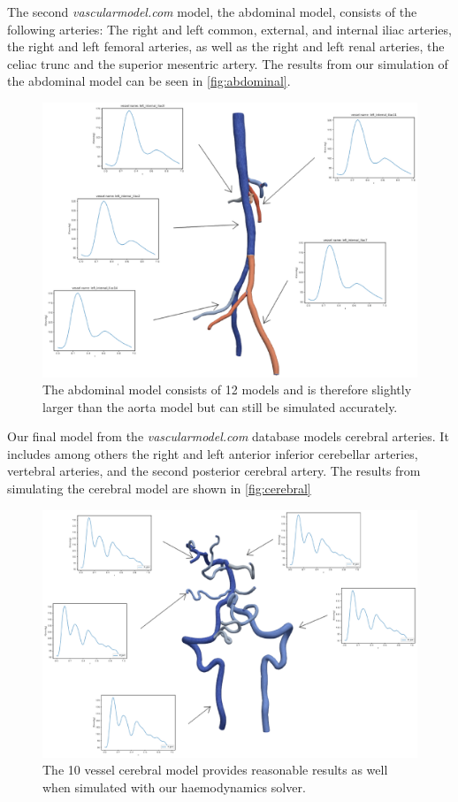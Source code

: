 \documentclass[a4paper, oneside]{discothesis}
\begin{document}
The second \emph{vascularmodel.com} model, the abdominal model, consists of the following arteries: 
The right and left common, external, and internal iliac arteries, the right and left femoral arteries, as well as the right and left renal arteries, the celiac trunc and the superior mesentric artery.
The results from our simulation of the abdominal model can be seen in \autoref{fig:abdominal}.
\begin{figure} [!ht]
	\centering
	\includegraphics[width=0.8\columnwidth]{figures/0029_annotated.eps}
	\caption{The abdominal model consists of 12 models and is therefore slightly larger than the aorta model but can still be simulated accurately.}
	\label{fig:abdominal}
\end{figure}
Our final model from the \emph{vascularmodel.com} database models cerebral arteries.
It includes among others the right and left anterior inferior cerebellar arteries, vertebral arteries, and the second posterior cerebral artery.
The results from simulating the cerebral model are shown in \autoref{fig:cerebral}
\begin{figure} [!ht]
	\centering
	\includegraphics[width=0.8\columnwidth]{figures/0053_annotated.eps}
	\caption{The 10 vessel cerebral model provides reasonable results as well when simulated with our haemodynamics solver.}
	\label{fig:cerebral}
\end{figure}
\end{document}
